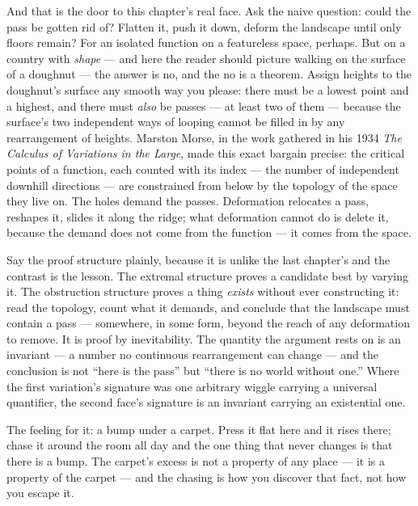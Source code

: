 And that is the door to this chapter's real face. Ask the naive question:
could the pass be gotten rid of? Flatten it, push it down, deform the
landscape until only floors remain? For an isolated function on a
featureless space, perhaps. But on a country with \emph{shape} --- and
here the reader should picture walking on the surface of a doughnut ---
the answer is no, and the no is a theorem. Assign heights to the
doughnut's surface any smooth way you please: there must be a lowest
point and a highest, and there must \emph{also} be passes --- at least
two of them --- because the surface's two independent ways of looping
cannot be filled in by any rearrangement of heights. Marston Morse, in
the work gathered in his 1934 \emph{The Calculus of Variations in the
Large}, made this exact bargain precise: the critical points of a
function, each counted with its index --- the number of independent
downhill directions --- are constrained from below by the topology of
the space they live on. The holes demand the passes. Deformation relocates a
pass, reshapes it, slides it along the ridge; what deformation cannot do
is delete it, because the demand does not come from the function --- it
comes from the space.

Say the proof structure plainly, because it is unlike the last chapter's
and the contrast is the lesson. The extremal structure proves a
candidate best by varying it. The obstruction structure proves a thing
\emph{exists} without ever constructing it: read the topology, count
what it demands, and conclude that the landscape must contain a pass ---
somewhere, in some form, beyond the reach of any deformation to remove.
It is proof by inevitability. The quantity the argument rests on is an
invariant --- a number no continuous rearrangement can change --- and
the conclusion is not ``here is the pass'' but ``there is no world
without one.'' Where the first variation's signature was one arbitrary
wiggle carrying a universal quantifier, the second face's signature is
an invariant carrying an existential one.

\begin{intuition}
The feeling for it: a bump under a carpet. Press it flat here and it
rises there; chase it around the room all day and the one thing that
never changes is that there is a bump. The carpet's excess is not a
property of any place --- it is a property of the carpet --- and the
chasing is how you discover that fact, not how you escape it.
\end{intuition}

